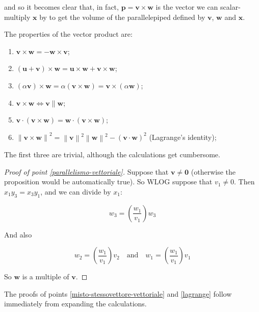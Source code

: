\documentclass[12pt,a4paper]{report}
\newcommand{\norm}[1]{\left\lVert#1\right\rVert}
\numberwithin{equation}{section}
\theoremstyle{definition}
\theoremstyle{remark}
\begin{document}
and so it becomes clear that, in fact, $\mathbf{p} = \mathbf{v}\times \mathbf{w}$ is the vector we can scalar-multiply $\mathbf{x}$ by to get the volume of the parallelepiped defined by $\mathbf{v}$, $\mathbf{w}$ and $\mathbf{x}$.

The properties of the vector product are:

\begin{enumerate}
\item $\mathbf{v} \times \mathbf{w} = -\mathbf{w} \times \mathbf{v}$;
\item $(\mathbf{u} + \mathbf{v}) \times \mathbf{w} = \mathbf{u} \times \mathbf{w} + \mathbf{v} \times \mathbf{w}$;
\item $(\alpha \mathbf{v}) \times \mathbf{w} = \alpha (\mathbf{v}\times \mathbf{w}) = \mathbf{v} \times (\alpha \mathbf{w})$;
\item $\mathbf{v} \times \mathbf{w} \iff \mathbf{v}\parallel \mathbf{w}$;\label{parallelismo-vettoriale}
\item $\mathbf{v} \cdot (\mathbf{v} \times \mathbf{w}) = \mathbf{w} \cdot (\mathbf{v} \times \mathbf{w})$;\label{misto-stessovettore-vettoriale}
\item $\norm{\mathbf{v} \times \mathbf{w}}^2 = \norm{\mathbf{v}}^2\norm{\mathbf{w}}^2 - (\mathbf{v}\cdot \mathbf{w})^2$ (Lagrange's identity);\label{lagrange}
\end{enumerate}

The first three are trivial, although the calculations get cumbersome.

\begin{proof}[Proof of point \ref{parallelismo-vettoriale}]
Suppose that $\mathbf{v} \neq \mathbf{0}$ (otherwise the proposition would be automatically true). So WLOG suppose that $v_1 \neq 0$. Then $x_1 y_3 = x_3 y_1$, and we can divide by $x_1$:

\begin{equation}
w_3 = \left( \frac{w_1}{v_1} \right) w_3
\end{equation}

And also

\begin{equation}
w_2 = \left( \frac{w_1}{v_1} \right) v_2 \quad \text{and} \quad w_1 = \left( \frac{w_1}{v_1} \right) v_1
\end{equation}

So $\mathbf{w}$ is a multiple of $\mathbf{v}$.
\end{proof}

The proofs of points \ref{misto-stessovettore-vettoriale} and \ref{lagrange} follow immediately from expanding the calculations.
\end{document}

